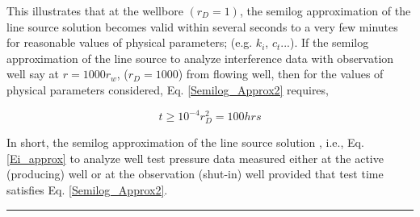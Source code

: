\documentclass{llncs}
\numberwithin{equation}{section}
\numberwithin{figure}{section}
\numberwithin{table}{section}
\begin{document}
    This  illustrates that at the wellbore $(r_{D}=1)$, the semilog approximation of the line source solution becomes valid within several seconds to a very few minutes for reasonable values of physical parameters; (e.g. $k_{i}$, $c_{t}$...). If  the semilog approximation of the line source  to analyze  interference data with  observation well say at $r=1000r_{w}$, ($r_{D}=1000$)  from  flowing well, then for the values of physical parameters considered, Eq. \ref{Semilog_Approx2} requires,
    
    \begin{equation*}
        t\geq10^{-4}{r_{D}^{2}}=100 hrs
    \end{equation*} 
    
    In short, the semilog approximation of the line source solution , i.e., Eq. \ref{Ei_approx} to analyze well test pressure data measured either at the active (producing) well or at the observation (shut-in) well provided that test time satisfies Eq. \ref{Semilog_Approx2}.\\
    \rule{\textwidth}{1pt}\\
    \vspace{15pt}




    
    
%
\end{document}
